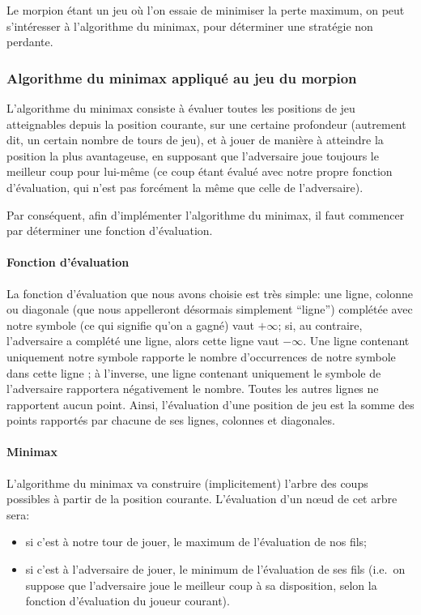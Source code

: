 Le morpion étant un jeu où l'on essaie de minimiser la perte maximum,
on peut s'intéresser à l'algorithme du minimax, pour déterminer une
stratégie non perdante.

\subsubsection{Algorithme du minimax appliqué au jeu du morpion}
L'algorithme du minimax consiste à évaluer toutes les positions de jeu
atteignables depuis la position courante, sur une certaine profondeur
(autrement dit, un certain nombre de tours de jeu), et à jouer de
manière à atteindre la position la plus avantageuse, en supposant que
l'adversaire joue toujours le meilleur coup pour lui-même (ce coup
étant évalué avec notre propre fonction d'évaluation, qui n'est pas
forcément la même que celle de l'adversaire).

Par conséquent, afin d'implémenter l'algorithme du minimax, il faut
commencer par déterminer une fonction d'évaluation.

\paragraph{Fonction d'évaluation}
La fonction d'évaluation que nous avons choisie est très simple: une
ligne, colonne ou diagonale (que nous appelleront désormais simplement
``ligne'') complétée avec notre symbole (ce qui signifie qu'on a
gagné) vaut $+\infty$; si, au contraire, l'adversaire a complété une
ligne, alors cette ligne vaut $-\infty$. Une ligne contenant
uniquement notre symbole rapporte le nombre d'occurrences de notre
symbole dans cette ligne ; à l'inverse, une ligne contenant uniquement
le symbole de l'adversaire rapportera négativement le nombre.
Toutes les autres lignes ne rapportent aucun point.
Ainsi, l'évaluation d'une position de jeu est la somme des points
rapportés par chacune de ses lignes, colonnes et diagonales.

\paragraph{Minimax}
L'algorithme du minimax va construire (implicitement) l'arbre des coups
possibles à partir de la position courante.
L'évaluation d'un nœud de cet arbre sera:
\begin{itemize}
  \item si c'est à notre tour de jouer, le maximum de l'évaluation de nos fils;
  \item si c'est à l'adversaire de jouer, le minimum de l'évaluation
    de ses fils (i.e.\ on suppose que l'adversaire joue le meilleur
    coup à sa disposition, selon la fonction d'évaluation du joueur courant).
\end{itemize}

